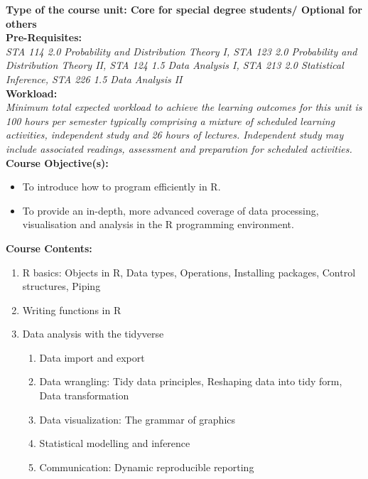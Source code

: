 \documentclass[a4paper,12pt]{article}
\begin{document}
\noindent\textbf{Type of the course unit: Core for special degree students/ Optional for others}\\

\noindent\textbf{Pre-Requisites:}\\
\noindent\textit{{ STA 114 2.0 Probability and Distribution Theory I, STA 123 2.0 Probability and Distribution Theory II, STA 124 1.5 Data Analysis I, STA 213 2.0 Statistical Inference, STA 226 1.5 Data Analysis II}}\\

\noindent\textbf{Workload:}\\
\noindent\textit{{ Minimum total expected workload to achieve the learning outcomes for this unit is 100 hours per semester typically comprising a mixture of scheduled learning activities, independent study and 26 hours of lectures. Independent study may include associated readings, assessment and preparation for scheduled activities.}}\\

\noindent\textbf{Course Objective(s):}
\begin{itemize}
	\setlength\itemsep{0.1mm}
	\item To introduce how to program efficiently in R.
	\item To provide an in-depth, more advanced coverage of data processing, visualisation and analysis in the R programming environment.
\end{itemize}
\noindent\textbf{Course Contents:}
\begin{enumerate}[label*=\arabic*.]
	\setlength\itemsep{0.1mm}
	\item R basics: Objects in R, Data types, Operations, Installing packages, Control structures, Piping
	\item Writing functions in R
	\item Data analysis with the tidyverse
	\begin{enumerate}[label*=\arabic*.]
	\item Data import and export
	\item Data wrangling: Tidy data principles, Reshaping data into tidy form, Data transformation
	\item Data visualization: The grammar of graphics
	\item Statistical	modelling	and	inference
	\item Communication: Dynamic reproducible reporting
	\end{enumerate}
\end{enumerate}
\end{document}
